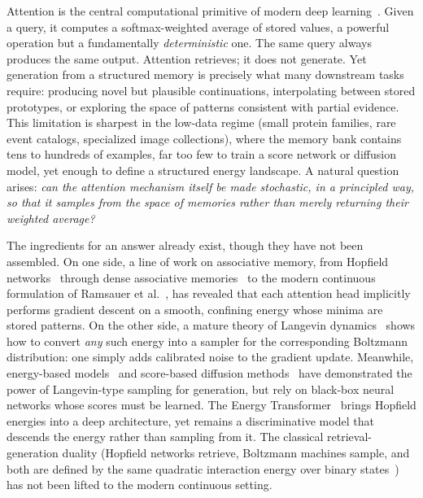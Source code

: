 
Attention is the central computational primitive of modern deep learning~\cite{vaswaniAttentionAllYou2017}. Given a query, it computes a softmax-weighted average of stored values, a powerful operation but a fundamentally \emph{deterministic} one. The same query always produces the same output. Attention retrieves; it does not generate. Yet generation from a structured memory is precisely what many downstream tasks require: producing novel but plausible continuations, interpolating between stored prototypes, or exploring the space of patterns consistent with partial evidence. This limitation is sharpest in the low-data regime (small protein families, rare event catalogs, specialized image collections), where the memory bank contains tens to hundreds of examples, far too few to train a score network or diffusion model, yet enough to define a structured energy landscape. A natural question arises: \emph{can the attention mechanism itself be made stochastic, in a principled way, so that it samples from the space of memories rather than merely returning their weighted average?}

The ingredients for an answer already exist, though they have not been assembled. On one side, a line of work on associative memory, from Hopfield networks~\cite{hopfieldNeuralNetworksPhysical1982} through dense associative memories~\cite{krotovDenseAssociativeMemory2016,krotovLargeAssociativeMemory2021} to the modern continuous formulation of Ramsauer et al.~\cite{ramsauerHopfieldNetworksAll2021}, has revealed that each attention head implicitly performs gradient descent on a smooth, confining energy whose minima are stored patterns. On the other side, a mature theory of Langevin dynamics~\cite{robertsTweedieExponentialConvergence1996,wellingBayesianLearningStochastic2011,durmusNonasymptoticAnalysisUnadjusted2017} shows how to convert \emph{any} such energy into a sampler for the corresponding Boltzmann distribution: one simply adds calibrated noise to the gradient update. Meanwhile, energy-based models~\cite{lecunTutorialEnergyBased2006,songHowTrainEnergyBased2021} and score-based diffusion methods~\cite{songGenerativeModelingEstimating2019,songScoreBasedGenerativeModeling2021} have demonstrated the power of Langevin-type sampling for generation, but rely on black-box neural networks whose scores must be learned. The Energy Transformer~\cite{hooverEnergyTransformer2024} brings Hopfield energies into a deep architecture, yet remains a discriminative model that descends the energy rather than sampling from it. The classical retrieval-generation duality (Hopfield networks retrieve, Boltzmann machines sample, and both are defined by the same quadratic interaction energy over binary states~\cite{ackeleyLearningAlgorithmBoltzmann1985}) has not been lifted to the modern continuous setting.

